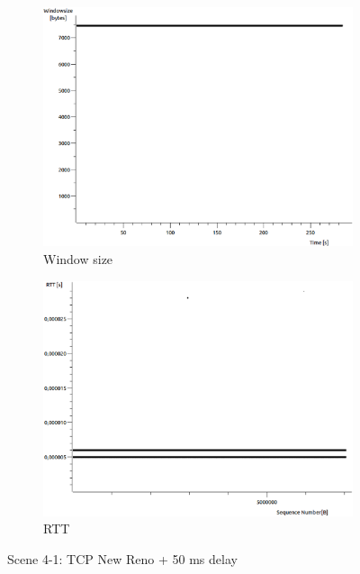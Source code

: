 \documentclass[conference,a4paper]{../../sty/IEEEtran}
\begin{document}
\begin{figure}
\begin{subfigure}[b]{0.2\textwidth}
  \includegraphics[width=\textwidth]{s4-1_wnd}
  \caption{Window size}
 \end{subfigure}
 \begin{subfigure}[b]{0.2\textwidth}
  \includegraphics[width=\textwidth]{s4-1_rtt}
  \caption{RTT}
 \end{subfigure}
 \caption{Scene 4-1: TCP New Reno + 50 ms delay}
\end{figure}
\end{document}
